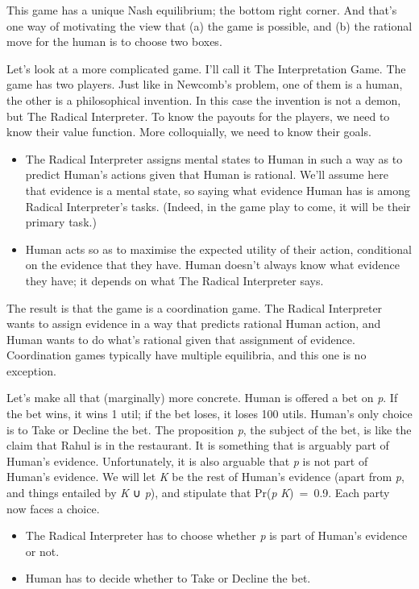 \documentclass[
  12pt,
  letterpaper,
]{scrbook}
\providecommand{\tightlist}{%
  \setlength{\itemsep}{0pt}\setlength{\parskip}{0pt}}\usepackage{longtable,booktabs,array}
\begin{document}
This game has a unique Nash equilibrium; the bottom right corner. And
that's one way of motivating the view that (a) the game is possible, and
(b) the rational move for the human is to choose two boxes.

Let's look at a more complicated game. I'll call it The Interpretation
Game. The game has two players. Just like in Newcomb's problem, one of
them is a human, the other is a philosophical invention. In this case
the invention is not a demon, but The Radical Interpreter. To know the
payouts for the players, we need to know their value function. More
colloquially, we need to know their goals.

\begin{itemize}
\tightlist
\item
  The Radical Interpreter assigns mental states to Human in such a way
  as to predict Human's actions given that Human is rational. We'll
  assume here that evidence is a mental state, so saying what evidence
  Human has is among Radical Interpreter's tasks. (Indeed, in the game
  play to come, it will be their primary task.)
\item
  Human acts so as to maximise the expected utility of their action,
  conditional on the evidence that they have. Human doesn't always know
  what evidence they have; it depends on what The Radical Interpreter
  says.
\end{itemize}

The result is that the game is a coordination game. The Radical
Interpreter wants to assign evidence in a way that predicts rational
Human action, and Human wants to do what's rational given that
assignment of evidence. Coordination games typically have multiple
equilibria, and this one is no exception.

Let's make all that (marginally) more concrete. Human is offered a bet
on \emph{p}. If the bet wins, it wins 1 util; if the bet loses, it loses
100 utils. Human's only choice is to Take or Decline the bet. The
proposition \emph{p}, the subject of the bet, is like the claim that
Rahul is in the restaurant. It is something that is arguably part of
Human's evidence. Unfortunately, it is also arguable that \emph{p} is
not part of Human's evidence. We will let \emph{K} be the rest of
Human's evidence (apart from \emph{p}, and things entailed by \emph{K} ∪
\emph{p}), and stipulate that Pr(\emph{p} \textbar{}\emph{K})~=~0.9.
Each party now faces a choice.

\begin{itemize}
\tightlist
\item
  The Radical Interpreter has to choose whether \emph{p} is part of
  Human's evidence or not.
\item
  Human has to decide whether to Take or Decline the bet.
\end{itemize}
\end{document}
